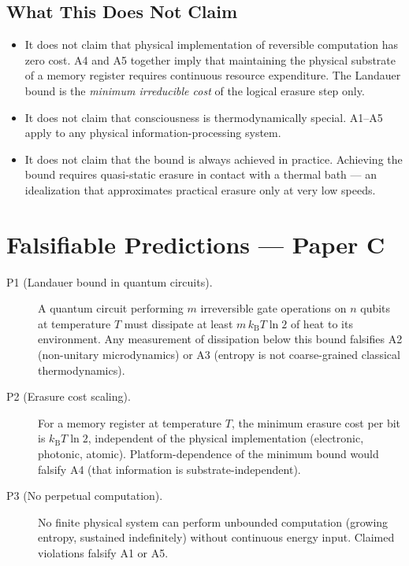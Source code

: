 \documentclass[12pt,letterpaper]{article}
\theoremstyle{plain}
\theoremstyle{definition}
\theoremstyle{remark}
\newcommand{\kB}{k_{\mathrm{B}}}
\begin{document}
\subsection{What This Does Not Claim}

\begin{itemize}
  \item It does not claim that physical implementation of reversible
    computation has zero cost. A4 and A5 together imply that maintaining
    the physical substrate of a memory register requires continuous
    resource expenditure. The Landauer bound is the \emph{minimum
    irreducible cost} of the logical erasure step only.
  \item It does not claim that consciousness is thermodynamically special.
    A1--A5 apply to any physical information-processing system.
  \item It does not claim that the bound is always achieved in practice.
    Achieving the bound requires quasi-static erasure in contact with a
    thermal bath --- an idealization that approximates practical erasure
    only at very low speeds.
\end{itemize}

\section{Falsifiable Predictions --- Paper C}
\label{sec:predictions_C}

\begin{description}
  \item[P1 (Landauer bound in quantum circuits).] A quantum circuit
    performing $m$ irreversible gate operations on $n$ qubits at
    temperature $T$ must dissipate at least $m\,\kB T\ln 2$ of heat
    to its environment. Any measurement of dissipation below this bound
    falsifies A2 (non-unitary microdynamics) or A3 (entropy is not
    coarse-grained classical thermodynamics).
  \item[P2 (Erasure cost scaling).] For a memory register at temperature
    $T$, the minimum erasure cost per bit is $\kB T\ln 2$, independent
    of the physical implementation (electronic, photonic, atomic).
    Platform-dependence of the minimum bound would falsify A4 (that
    information is substrate-independent).
  \item[P3 (No perpetual computation).] No finite physical system can
    perform unbounded computation (growing entropy, sustained indefinitely)
    without continuous energy input. Claimed violations falsify A1 or A5.
\end{description}
\end{document}
